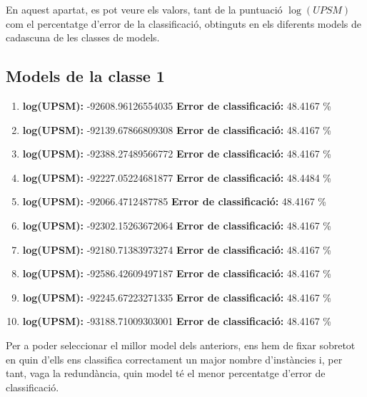 
	En aquest apartat, es pot veure els valors, tant de la puntuació $\log(UPSM)$ com el percentatge d'error de la classificació, obtinguts en els diferents models de cadascuna de les classes de models. 
	\subsection{Models de la classe 1}
	\begin{enumerate}
		\item \textbf{log(UPSM):} -92608.96126554035 \textbf{Error de classificació:} 48.4167 \%
		\item \textbf{log(UPSM):} -92139.67866809308 \textbf{Error de classificació:} 48.4167 \%
		\item \textbf{log(UPSM):} -92388.27489566772 \textbf{Error de classificació:} 48.4167 \%
		\item \textbf{log(UPSM):} -92227.05224681877 \textbf{Error de classificació:} 48.4484 \%
		\item \textbf{log(UPSM):} -92066.4712487785 \textbf{Error de classificació:} 48.4167 \%
		\item \textbf{log(UPSM):} -92302.15263672064 \textbf{Error de classificació:} 48.4167 \%
		\item \textbf{log(UPSM):} -92180.71383973274 \textbf{Error de classificació:} 48.4167 \%
		\item \textbf{log(UPSM):} -92586.42609497187 \textbf{Error de classificació:} 48.4167 \%
		\item \textbf{log(UPSM):} -92245.67223271335 \textbf{Error de classificació:} 48.4167 \%
		\item \textbf{log(UPSM):} -93188.71009303001 \textbf{Error de classificació:} 48.4167 \%
	\end{enumerate}
	\vspace{0.5cm}
	Per a poder seleccionar el millor model dels anteriors, ens hem de fixar sobretot en quin d'ells ens classifica correctament un major nombre d'instàncies i, per tant, vaga la redundància, quin model té el menor percentatge d'error de classificació.\\
